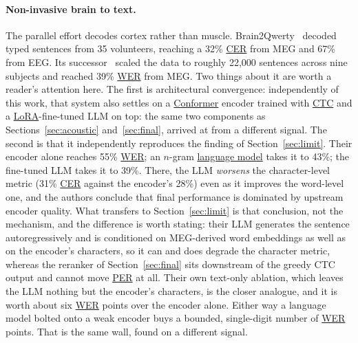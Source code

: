 \documentclass{article}
\DeclareRobustCommand{\glref}[2]{\hyperlink{gl:#1}{\textcolor{glosslink}{#2}}}
\DeclareRobustCommand{\wer}{\glref{wer}{WER}}
\DeclareRobustCommand{\per}{\glref{per}{PER}}
\DeclareRobustCommand{\cer}{\glref{cer}{CER}}
\begin{document}
\paragraph{Non-invasive brain to text.}
The parallel effort decodes cortex rather than muscle. Brain2Qwerty~\citep{levy2025brain2qwerty}
decoded typed sentences from 35 volunteers, reaching a 32\% \cer{} from MEG and 67\% from EEG. Its
successor~\citep{zhang2026brain2qwerty2} scaled the data to roughly 22{,}000 sentences across nine
subjects and reached 39\% \wer{} from MEG. Two things about it are worth a reader's attention here.
The first is architectural convergence: independently of this work, that system also settles on a
\glref{conformer}{Conformer} encoder trained with \glref{ctc}{CTC} and a
\glref{lora}{LoRA}-fine-tuned LLM on top: the same two components as Sections~\ref{sec:acoustic}
and~\ref{sec:final}, arrived at from a different signal. The second is that it independently
reproduces the finding of Section~\ref{sec:limit}. Their encoder alone reaches 55\% \wer{}; an
$n$-gram \glref{lm}{language model} takes it to 43\%; the fine-tuned LLM takes it to 39\%. There, the
LLM \emph{worsens} the character-level metric (31\% \cer{} against the encoder's 28\%) even as it
improves the word-level one, and the authors conclude that final performance is dominated by upstream
encoder quality. What transfers to Section~\ref{sec:limit} is that conclusion, not the mechanism, and
the difference is worth stating: their LLM generates the sentence autoregressively and is conditioned
on MEG-derived word embeddings as well as on the encoder's characters, so it can and does degrade the
character metric, whereas the reranker of Section~\ref{sec:final} sits downstream of the greedy CTC
output and cannot move \per{} at all. Their own text-only ablation, which leaves the LLM nothing but
the encoder's characters, is the closer analogue, and it is worth about six \wer{} points over the
encoder alone. Either way a language model bolted onto a weak encoder buys a bounded, single-digit
number of \wer{} points. That is the same wall, found on a different signal.
\end{document}
